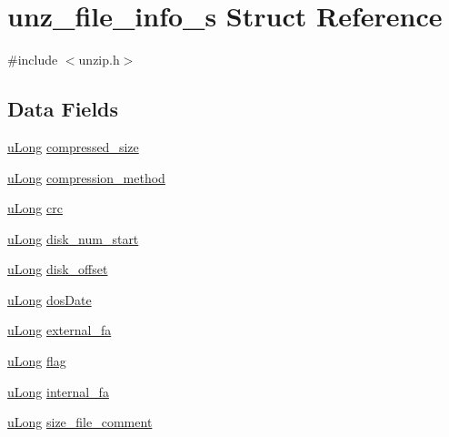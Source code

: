 \hypertarget{structunz__file__info__s}{}\section{unz\+\_\+file\+\_\+info\+\_\+s Struct Reference}
\label{structunz__file__info__s}


{\ttfamily \#include $<$unzip.\+h$>$}

\subsection*{Data Fields}
\begin{DoxyCompactItemize}
\item 
\hyperlink{ioapi_8h_a50e9e9d5c30e481de822ad68fe537986}{u\+Long} \hyperlink{structunz__file__info__s_a35ee9d733879c87565e40a545fe46fb6}{compressed\+\_\+size}
\item 
\hyperlink{ioapi_8h_a50e9e9d5c30e481de822ad68fe537986}{u\+Long} \hyperlink{structunz__file__info__s_aaaca88f0ebec5c1cfebb436b8e70a774}{compression\+\_\+method}
\item 
\hyperlink{ioapi_8h_a50e9e9d5c30e481de822ad68fe537986}{u\+Long} \hyperlink{structunz__file__info__s_a6d741cb2df07794d7a4794841148893b}{crc}
\item 
\hyperlink{ioapi_8h_a50e9e9d5c30e481de822ad68fe537986}{u\+Long} \hyperlink{structunz__file__info__s_ab7bfba2b7d0cdb7260a7cd9f9ccd00ff}{disk\+\_\+num\+\_\+start}
\item 
\hyperlink{ioapi_8h_a50e9e9d5c30e481de822ad68fe537986}{u\+Long} \hyperlink{structunz__file__info__s_af2f0b404ba54d082c8b070c405eab99e}{disk\+\_\+offset}
\item 
\hyperlink{ioapi_8h_a50e9e9d5c30e481de822ad68fe537986}{u\+Long} \hyperlink{structunz__file__info__s_a14bd7da84cada0f4b1455d60274eef91}{dos\+Date}
\item 
\hyperlink{ioapi_8h_a50e9e9d5c30e481de822ad68fe537986}{u\+Long} \hyperlink{structunz__file__info__s_ae3365fdb260668fca60bfb975b1513aa}{external\+\_\+fa}
\item 
\hyperlink{ioapi_8h_a50e9e9d5c30e481de822ad68fe537986}{u\+Long} \hyperlink{structunz__file__info__s_adff7171a3114d55e5532c593b1779ecc}{flag}
\item 
\hyperlink{ioapi_8h_a50e9e9d5c30e481de822ad68fe537986}{u\+Long} \hyperlink{structunz__file__info__s_aa20738bf82bca71cc950b9475b5d8c3c}{internal\+\_\+fa}
\item 
\hyperlink{ioapi_8h_a50e9e9d5c30e481de822ad68fe537986}{u\+Long} \hyperlink{structunz__file__info__s_afa9feffb3b9c9c03e02599118d5f548e}{size\+\_\+file\+\_\+comment}

\end{DoxyCompactItemize}
